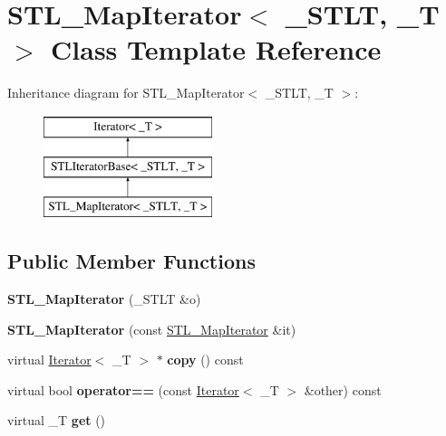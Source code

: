 \hypertarget{class_s_t_l___map_iterator}{
\section{STL\_\-MapIterator$<$ \_\-STLT, \_\-T $>$ Class Template Reference}
\label{class_s_t_l___map_iterator}
}
Inheritance diagram for STL\_\-MapIterator$<$ \_\-STLT, \_\-T $>$:\begin{figure}[H]
\begin{center}
\leavevmode
\includegraphics[height=3cm]{class_s_t_l___map_iterator}
\end{center}
\end{figure}
\subsection*{Public Member Functions}
\begin{DoxyCompactItemize}
\item 
\hypertarget{class_s_t_l___map_iterator_a6d1053c1cd9d14a53ae54f2817fbc9b3}{
{\bfseries STL\_\-MapIterator} (\_\-STLT \&o)}
\label{class_s_t_l___map_iterator_a6d1053c1cd9d14a53ae54f2817fbc9b3}

\item 
\hypertarget{class_s_t_l___map_iterator_acbd006a63d9fcd907b8e9e7b44bf166e}{
{\bfseries STL\_\-MapIterator} (const \hyperlink{class_s_t_l___map_iterator}{STL\_\-MapIterator} \&it)}
\label{class_s_t_l___map_iterator_acbd006a63d9fcd907b8e9e7b44bf166e}

\item 
\hypertarget{class_s_t_l___map_iterator_a6566905cb74d21eff0d9051529ea8434}{
virtual \hyperlink{class_iterator}{Iterator}$<$ \_\-T $>$ $\ast$ {\bfseries copy} () const }
\label{class_s_t_l___map_iterator_a6566905cb74d21eff0d9051529ea8434}

\item 
\hypertarget{class_s_t_l___map_iterator_a72cdc438dfafbacfc1bb53ab81e3867c}{
virtual bool {\bfseries operator==} (const \hyperlink{class_iterator}{Iterator}$<$ \_\-T $>$ \&other) const }
\label{class_s_t_l___map_iterator_a72cdc438dfafbacfc1bb53ab81e3867c}

\item 
\hypertarget{class_s_t_l___map_iterator_a6f49337e69acd7782234c6b49ffc76b9}{
virtual \_\-T {\bfseries get} ()}
\label{class_s_t_l___map_iterator_a6f49337e69acd7782234c6b49ffc76b9}

\end{DoxyCompactItemize}
